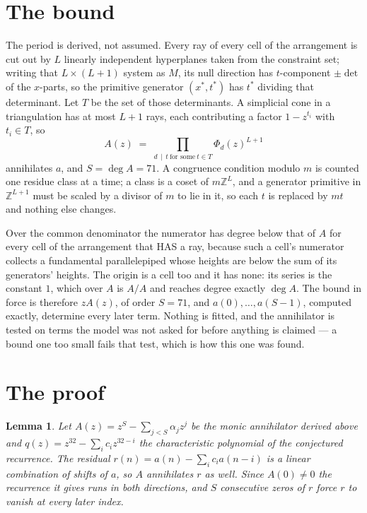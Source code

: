 \documentclass[11pt,a4paper]{article}
\theoremstyle{plain}
\newtheorem{lemma}[theorem]{Lemma}
\theoremstyle{definition}
\begin{document}
\section{The bound}

The period is derived, not assumed. Every ray of every cell of the arrangement is cut out by
$L$ linearly independent hyperplanes taken from the constraint set; writing that $L\times(L+1)$
system as $M$, its null direction has $t$-component $\pm\det$ of the $x$-parts, so the
primitive generator $(x^*,t^*)$ has $t^*$ dividing that determinant. Let $T$ be the set of
those determinants. A simplicial cone in a triangulation has at most $L+1$ rays, each
contributing a factor $1-z^{t_i}$ with $t_i\in T$, so
\[
A(z)\;=\;\prod_{d\,\mid\,t\ \text{for some}\ t\in T}\Phi_d(z)^{L+1}
\]
annihilates $a$, and $S=\deg A=71$. A congruence condition modulo $m$ is counted one residue
class at a time; a class is a coset of $m\mathbb{Z}^L$, and a generator primitive in
$\mathbb{Z}^{L+1}$ must be scaled by a divisor of $m$ to lie in it, so each $t$ is replaced
by $mt$ and nothing else changes.

Over the common denominator the numerator has degree below that of $A$ for every cell of the
arrangement that HAS a ray, because such a cell's numerator collects a fundamental
parallelepiped whose heights are below the sum of its generators' heights. The origin is a cell
too and it has none: its series is the constant $1$, which over $A$ is $A/A$ and reaches degree
exactly $\deg A$. The bound in force is therefore $zA(z)$, of order $S=71$, and
$a(0),\dots,a(S-1)$, computed exactly, determine every later term. Nothing is fitted, and the
annihilator is tested on terms the model was not asked for before anything is claimed --- a
bound one too small fails that test, which is how this one was found.

\section{The proof}

\begin{lemma}\label{lem:crit}
Let $A(z)=z^S-\sum_{j<S}\alpha_jz^{j}$ be the monic annihilator derived above and
$q(z)=z^{32}-\sum_ic_iz^{32-i}$ the characteristic polynomial of the conjectured
recurrence. The residual $r(n)=a(n)-\sum_ic_ia(n-i)$ is a linear combination of shifts of $a$,
so $A$ annihilates $r$ as well. Since $A(0)\ne0$ the recurrence it gives runs in both
directions, and $S$ consecutive zeros of $r$ force $r$ to vanish at every later index.
\end{lemma}
\end{document}
